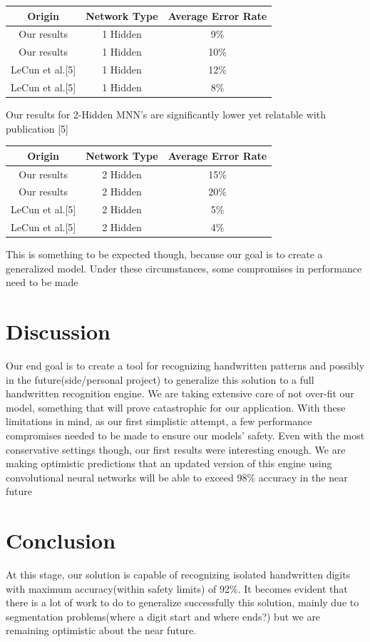 \documentclass{proc}
\begin{document}
	\begin{center}
		\begin{tabular}{ |c|c|c| }
			\hline
			Origin&Network Type&Average Error Rate \\
			\hline
			Our results&1 Hidden& 9\% \\
			Our results&1 Hidden& 10\% \\
			LeCun et al.[5]&1 Hidden  & 12\% \\
			LeCun et al.[5]&1 Hidden  & 8\% \\
			\hline
		\end{tabular}
	\end{center}
 
	Our results for 2-Hidden MNN's are significantly lower yet relatable with publication [5]
	\begin{center}
		\begin{tabular}{ |c|c|c| }
			\hline
			Origin&Network Type&Average Error Rate \\
			\hline
			Our results&2 Hidden& 15\% \\
			Our results&2 Hidden& 20\% \\
			LeCun et al.[5]&2 Hidden  & 5\% \\
			LeCun et al.[5]&2 Hidden  & 4\% \\
			\hline
		\end{tabular}
	\end{center}

    This is something to be expected though, because our goal is to create a generalized model. Under these circumstances, some compromises in performance need to be made
	\section{Discussion}
    Our end goal is to create a tool for recognizing handwritten patterns and possibly in the future(side/personal project) to generalize this solution to a full handwritten recognition engine. We are taking extensive care of not over-fit our model, something that will prove catastrophic for our application. With these limitations in mind, as our first simplistic attempt, a few performance compromises needed to be made to ensure our models' safety. Even with the most conservative settings though, our first results were interesting enough. We are making optimistic predictions that an updated version of this engine using convolutional neural networks will be able to exceed 98\% accuracy in the near future
	\section{Conclusion}
    At this stage, our solution is capable of recognizing isolated handwritten digits with maximum accuracy(within safety limits) of 92\%. It becomes evident that there is a lot of work to do to generalize successfully this solution, mainly due to segmentation problems(where a digit start and where ends?) but we are remaining optimistic about the near future.
\end{document}

